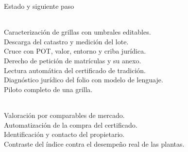 \documentclass[aspectratio=169, 11pt]{beamer}
\begin{document}
%
\begin{frame}{Estado y siguiente paso}
  \vspace{0.1em}
  \begin{minipage}[t]{0.47\textwidth}
    \raggedright
    \\[0.5em]{\footnotesize\textcolor{tinta2}{Caracterización de grillas con umbrales editables.\\[0.10em]
    Descarga del catastro y medición del lote.\\[0.10em]
    Cruce con POT, valor, entorno y criba jurídica.\\[0.10em]
    Derecho de petición de matrículas y su anexo.\\[0.10em]
    Lectura automática del certificado de tradición.\\[0.10em]
    Diagnóstico jurídico del folio con modelo de lenguaje.\\[0.10em]
    Piloto completo de una grilla.}}
  \end{minipage}\hfill
  \begin{minipage}[t]{0.47\textwidth}
    \raggedright
    \\[0.5em]{\footnotesize\textcolor{tinta2}{Valoración por comparables de mercado.\\[0.10em]
    Automatización de la compra del certificado.\\[0.10em]
    Identificación y contacto del propietario.\\[0.10em]
    Contraste del índice contra el desempeño real de las plantas.}}
  \end{minipage}


\end{frame}
\end{document}
